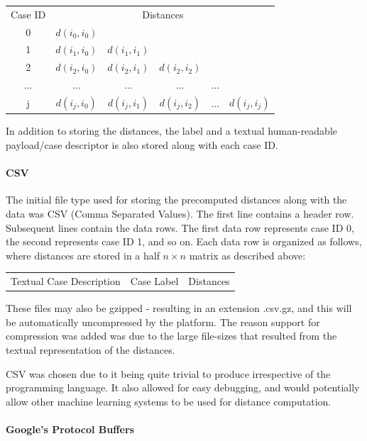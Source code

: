 \documentclass[a4paper,11pt]{report}
\begin{document}
\medskip

\begin{tabular}{ c c c c c c }
	Case ID & \multicolumn{5}{c}{Distances} \\
	0 & $d(i_{0},i_{0})$ &  &  &  & \\
	1 & $d(i_{1},i_{0})$ & $d(i_{1},i_{1})$ &  &  &  \\
	2 & $d(i_{2},i_{0})$ & $d(i_{2},i_{1})$ & $d(i_{2},i_{2})$ &  & \\ 
	... & ... & ... & ... & ... & \\ 
	j & $d(i_{j},i_{0})$ & $d(i_{j},i_{1})$ & $d(i_{j},i_{2})$ & ... & $d(i_{j},i_{j})$ \\ 
\end{tabular}

\medskip

In addition to storing the distances, the label and a textual human-readable payload/case descriptor is also stored along with each case ID.

\paragraph{CSV}
The initial file type used for storing the precomputed distances along with the data was CSV (Comma Separated Values). The first line contains a header row. Subsequent lines contain the data rows. The first data row represents case ID 0, the second represents case ID 1, and so on. Each data row is organized as follows, where distances are stored in a half $n \times n$ matrix as described above:
\medskip

\begin{tabular}{ |c| |c| |c| }
	Textual Case Description & Case Label & Distances \\
\end{tabular}

\medskip

These files may also be gzipped - resulting in an extension .csv.gz, and this will be automatically uncompressed by the platform. The reason support for compression was added was due to the large file-sizes that resulted from the textual representation of the distances.

CSV was chosen due to it being quite trivial to produce irrespective of the programming language. It also allowed for easy debugging, and would potentially allow other machine learning systems to be used for distance computation.

\paragraph{Google's Protocol Buffers \citep{prog:protocolbuffers}}
\end{document}
